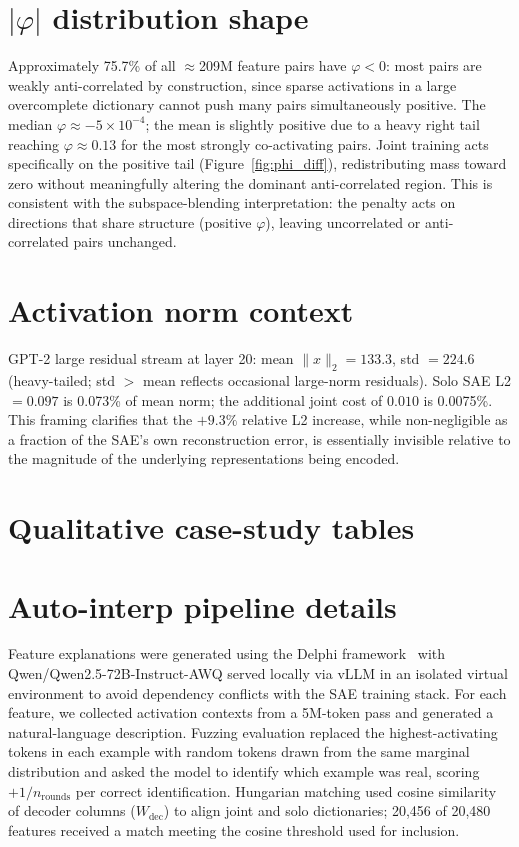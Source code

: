 \documentclass{article} %
\begin{document}
\section{$|\varphi|$ distribution shape}
\label{app:phi_shape}

Approximately 75.7\% of all $\approx$209M feature pairs have $\varphi < 0$:
most pairs are weakly anti-correlated by construction, since sparse activations
in a large overcomplete dictionary cannot push many pairs simultaneously positive.
The median $\varphi \approx -5\times10^{-4}$; the mean is slightly positive due
to a heavy right tail reaching $\varphi \approx 0.13$ for the most strongly
co-activating pairs.
Joint training acts specifically on the positive tail (Figure~\ref{fig:phi_diff}),
redistributing mass toward zero without meaningfully altering the dominant
anti-correlated region.
This is consistent with the subspace-blending interpretation: the penalty acts on
directions that share structure (positive $\varphi$), leaving uncorrelated or
anti-correlated pairs unchanged.

\section{Activation norm context}
\label{app:norm}

GPT-2 large residual stream at layer 20: mean $\|x\|_2 = 133.3$,
std $= 224.6$ (heavy-tailed; std $>$ mean reflects occasional large-norm residuals).
Solo SAE L2 $= 0.097$ is 0.073\% of mean norm; the additional joint cost of
$0.010$ is 0.0075\%.
This framing clarifies that the $+9.3\%$ relative L2 increase, while
non-negligible as a fraction of the SAE's own reconstruction error, is
essentially invisible relative to the magnitude of the underlying representations
being encoded.

\section{Qualitative case-study tables}
\label{app:qual}



\section{Auto-interp pipeline details}
\label{app:autointerp}

Feature explanations were generated using the Delphi framework~\citep{bills2023language}
with Qwen/Qwen2.5-72B-Instruct-AWQ served locally via vLLM in an isolated virtual
environment to avoid dependency conflicts with the SAE training stack.
For each feature, we collected activation contexts from a 5M-token pass and
generated a natural-language description.
Fuzzing evaluation replaced the highest-activating tokens in each example with
random tokens drawn from the same marginal distribution and asked the model to
identify which example was real, scoring $+1/n_\text{rounds}$ per correct
identification.
Hungarian matching used cosine similarity of decoder columns ($W_\text{dec}$)
to align joint and solo dictionaries; 20,456 of 20,480 features received a
match meeting the cosine threshold used for inclusion.
\end{document}
